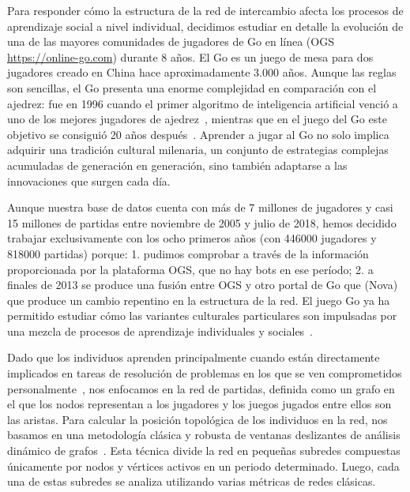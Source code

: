 \documentclass[a4paper,11pt]{book}
\theoremstyle{definition}
\begin{document}
Para responder c\'omo la estructura de la red de intercambio afecta los procesos de aprendizaje social a nivel individual, decidimos estudiar en detalle la evoluci\'on de una de las mayores comunidades de jugadores de Go en l\'inea (OGS \url{https://online-go.com}) durante 8 a\~nos.
%
El Go es un juego de mesa para dos jugadores creado en China hace aproximadamente 3.000 a\~nos.
%
Aunque las reglas son sencillas, el Go presenta una enorme complejidad en comparaci\'on con el ajedrez: fue en 1996 cuando el primer algoritmo de inteligencia artificial venci\'o a uno de los mejores jugadores de ajedrez~\cite{Campbell2002}, mientras que en el juego del Go este objetivo se consigui\'o 20 a\~nos despu\'es~\cite{Plata2016}.
%
Aprender a jugar al Go no solo implica adquirir una tradici\'on cultural milenaria, un conjunto de estrategias complejas acumuladas de generaci\'on en generaci\'on, sino tambi\'en adaptarse a las innovaciones que surgen cada d\'ia.


Aunque nuestra base de datos cuenta con m\'as de 7 millones de jugadores y casi 15 millones de partidas entre noviembre de 2005 y julio de 2018, hemos decidido trabajar exclusivamente con los ocho primeros a\~nos (con \num{446000} jugadores y \num{818000} partidas) porque: 1. pudimos comprobar a trav\'es de la informaci\'on proporcionada por la plataforma OGS, que no hay bots en ese per\'iodo; 2. a finales de 2013 se produce una fusi\'on entre OGS y otro portal de Go que (Nova) que produce un cambio repentino en la estructura de la red.
%
El juego Go ya ha permitido estudiar c\'omo las variantes culturales particulares son impulsadas por una mezcla de procesos de aprendizaje individuales y sociales~\cite{Beheim2014}.


Dado que los individuos aprenden principalmente cuando est\'an directamente implicados en tareas de resoluci\'on de problemas en los que se ven comprometidos personalmente~\cite{Ormrod2017}, nos enfocamos en la red de partidas, definida como un grafo en el que los nodos representan a los jugadores y los juegos jugados entre ellos son las aristas.
%
Para calcular la posici\'on topol\'ogica de los individuos en la red, nos basamos en una metodolog\'ia cl\'asica y robusta de ventanas deslizantes de an\'alisis din\'amico de grafos~\cite{Kossinets2006, Mcgregor2014}.
%
Esta t\'ecnica divide la red en peque\~nas subredes compuestas \'unicamente por nodos y v\'ertices activos en un periodo determinado.
%
Luego, cada una de estas subredes se analiza utilizando varias m\'etricas de redes cl\'asicas.
\end{document}
